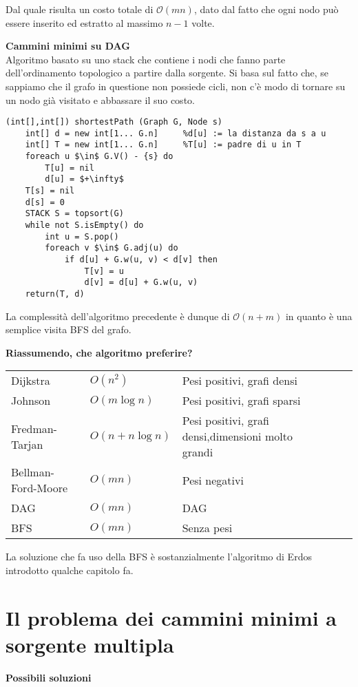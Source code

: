 \documentclass[../cheatSheetAlgoritmi.tex]{subfiles}
\begin{document}
\bigskip
Dal quale risulta un costo totale di $\mathcal{O}(mn)$, dato dal fatto che ogni nodo può essere inserito ed estratto al massimo $n-1$ volte.

 
\textbf{Cammini minimi su DAG} \\
Algoritmo basato su uno stack che contiene i nodi che fanno parte dell'ordinamento topologico a partire dalla sorgente. Si basa sul fatto che, se sappiamo che il grafo in questione non possiede cicli, non c'è modo di tornare su un nodo già visitato e abbassare il suo costo.
\begin{lstlisting}[caption=Algoritmo per i DAG: cammini minimi a sorgente singola]
(int[],int[]) shortestPath (Graph G, Node s)
	int[] d = new int[1... G.n]		%d[u] := la distanza da s a u 
	int[] T = new int[1... G.n]		%T[u] := padre di u in T
	foreach u $\in$ G.V() - {s} do
		T[u] = nil
		d[u] = $+\infty$
	T[s] = nil
	d[s] = 0
	STACK S = topsort(G)
	while not S.isEmpty() do 
		int u = S.pop()
		foreach v $\in$ G.adj(u) do
			if d[u] + G.w(u, v) < d[v] then 
				T[v] = u 
				d[v] = d[u] + G.w(u, v)
	return(T, d)
\end{lstlisting}
La complessità dell'algoritmo precedente è dunque di $\mathcal{O}(n + m)$ in quanto è una semplice visita BFS del grafo.

\bigskip
\textbf{Riassumendo, che algoritmo preferire?}

\bigskip
\begin{tabular}{lllll}
Dijkstra       &  $O(n^2)$ & Pesi positivi, grafi densi &  \\
Johnson        &  $O(m \log n)$ &  Pesi positivi, grafi sparsi &  \\
Fredman-Tarjan &  $O(n + n \log n)$ & Pesi positivi, grafi densi,dimensioni molto grandi  & \\
Bellman-Ford-Moore &  $O(mn)$ & Pesi negativi &  \\
DAG               & $O(mn)$ & DAG  &  \\
BFS	 & $O(mn)$ & Senza pesi &  \\
\end{tabular}

\bigskip
La soluzione che fa uso della BFS è sostanzialmente l'algoritmo di Erdos introdotto qualche capitolo fa.

\section{Il problema dei cammini minimi a sorgente multipla}
\textbf{Possibili soluzioni}
\end{document}
